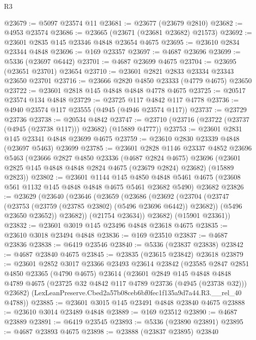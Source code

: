 \begin{lexlean}{R3}
\begin{coremodule}
@23679 := @5097 @23574 @11
@23681 := @23677 (@23679 @2810)
@23682 := @4953 @23574
@23686 := @23665 (@23671 (@23681 @23682) @21573)
@23692 := @23601 @2835 @145 @23346 @4848 @23654 @4675
@23695 := @23610 @2834 @23344 @4848
@23696 := @169 @23357
@23697 := @4687 @23696
@23699 := @5336 (@23697 @6442)
@23701 := @4687 @23699 @4675
@23704 := @23695 (@23651 @23701) @23654
@23710 := @23601 @2821 @2833 @23334 @23343 @23650 @23701
@23716 := @23666 @2820 @4850 @23333 (@4779 @4675) @23650
@23722 := @23601 @2818 @145 @4848 @4848 @4778 @4675
@23725 := @20517 @23574 @134 @4848
@23729 := @23725 @117 @4842 @117 @4778
@23736 := @4940 @23574 @117 @23555 (@4945 (@4946 @23574 @117))
@23737 := @23729 @23736
@23738 := @20534 @4842
@23747 := @23710 (@23716 (@23722 (@23737 (@4945 (@23738 @117))) @23682) (@15889 @4777))
@23753 := @23601 @2831 @145 @23341 @4848 @23699 @4675
@23759 := @23610 @2830 @23339 @4848 (@23697 @5463) @23699
@23785 := @23601
    @2828
    @1146
    @23337
    @4852
    @23696
    @5463
    (@23666
      @2827
      @4850
      @23336
      (@4687 @2824 @4675)
      @23696
      (@23601 @2825 @145 @4848 @4848 @2824 @4675 (@23679 @2824) @23682)
      (@15889 @2823))
@23802 := @23601
    @1144
    @145
    @4850
    @4848
    @5461
    @4675
    (@23608 @561 @1132 @145 @4848 @4848 @4675 @5461 @23682 @5490)
    @23682
@23826 := @23629
    (@23640
      (@23646
        (@23659
          (@23686
            (@23692
              (@23704
                (@23747 (@23753 (@23759 (@23785 @23802) (@5496 @23696 @6442)) @23682))
                (@5496 @23650 @23652))
              @23682))
          (@21754 @23634))
        @23682)
      (@15901 @23361))
@23832 := @23601 @3019 @145 @23496 @4848 @23618 @4675
@23835 := @23610 @3018 @23494 @4848
@23836 := @169 @23510
@23837 := @4687 @23836
@23838 := @6419 @23546
@23840 := @5336 (@23837 @23838)
@23842 := @4687 @23840 @4675
@23845 := @23835 (@23615 @23842) @23618
@23879 := @23601
    @2852
    @3017
    @23366
    @23493
    @23614
    @23842
    (@23585
      @2847
      @2851
      @4850
      @23365
      (@4790 @4675)
      @23614
      (@23601
        @2849
        @145
        @4848
        @4848
        @4789
        @4675
        (@23725 @32 @4842 @117 @4789 @23736 (@4945 (@23738 @32)))
        @23682)
      (LexLeanPreserve.Cbed2a57b08ceb6bf0fec1f135a9d7a44.R3.__rel_40 @4788))
@23885 := @23601 @3015 @145 @23491 @4848 @23840 @4675
@23888 := @23610 @3014 @23489 @4848
@23889 := @169 @23512
@23890 := @4687 @23889
@23891 := @6419 @23545
@23893 := @5336 (@23890 @23891)
@23895 := @4687 @23893 @4675
@23898 := @23888 (@23837 @23895) @23840

\end{coremodule}
\end{lexlean}
